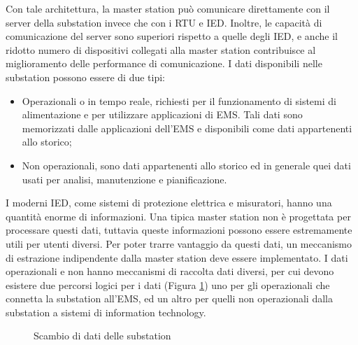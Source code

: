 Con tale architettura, la master station può comunicare direttamente con il server della substation invece che con i RTU e IED. Inoltre, le capacità di comunicazione del server sono superiori rispetto a quelle degli IED, e anche il ridotto numero di dispositivi collegati alla master station contribuisce al miglioramento delle performance di comunicazione.
I dati disponibili nelle substation possono essere di due tipi:
\begin{itemize}
	\item Operazionali o in tempo reale, richiesti per il funzionamento di sistemi di alimentazione e per utilizzare applicazioni di EMS. Tali dati sono memorizzati dalle applicazioni dell'EMS e disponibili come dati appartenenti allo storico;
	\item Non operazionali, sono dati appartenenti allo storico ed in generale quei dati usati per analisi, manutenzione e pianificazione. 
\end{itemize} 
I moderni IED, come sistemi di protezione elettrica e misuratori, hanno una quantità enorme di informazioni. Una tipica master station non è progettata per processare questi dati, tuttavia queste informazioni possono essere estremamente utili per utenti diversi. Per poter trarre vantaggio da questi dati, un meccanismo di estrazione indipendente dalla master station deve essere implementato. I dati operazionali e non hanno meccanismi di raccolta dati diversi, per cui devono esistere due percorsi logici per i dati (Figura \ref{fig:28}) uno per gli operazionali che connetta la substation all'EMS, ed un altro per quelli non operazionali dalla substation a sistemi di information technology. 
\begin{figure}[!h] 
\caption{Scambio di dati delle substation}\label{fig:28}
\end{figure}
